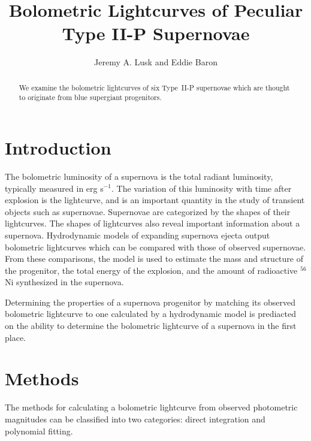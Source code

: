 \documentclass[apj]{emulateapj}
\begin{document}
\title{Bolometric Lightcurves of Peculiar Type II-P Supernovae}
\author{Jeremy A. Lusk and Eddie Baron} 


\begin{abstract}
We examine the bolometric lightcurves of six Type~II-P supernovae which are thought to originate from blue supergiant progenitors.

\end{abstract}

\section{Introduction}

The bolometric luminosity of a supernova is the total radiant luminosity, typically measured in erg s$^{-1}$.
The variation of this luminosity with time after explosion is the lightcurve, and is an important quantity in the study of transient objects such as supernovae.
Supernovae are categorized by the shapes of their lightcurves. %
The shapes of lightcurves also reveal important information about a supernova.
Hydrodynamic models of expanding supernova ejecta output bolometric lightcurves which can be compared with those of observed supernovae.
From these comparisons, the model is used to estimate the mass and structure of the progenitor, the total energy of the explosion, and the amount of radioactive $^{56}$Ni synthesized in the supernova.

Determining the properties of a supernova progenitor by matching its observed bolometric lightcurve to one calculated by a hydrodynamic model is prediacted on the ability to determine the bolometric lightcurve of a supernova in the first place.

\section{Methods}

The methods for calculating a bolometric lightcurve from observed photometric magnitudes can be classified into two categories: direct integration and polynomial fitting.
\end{document}
